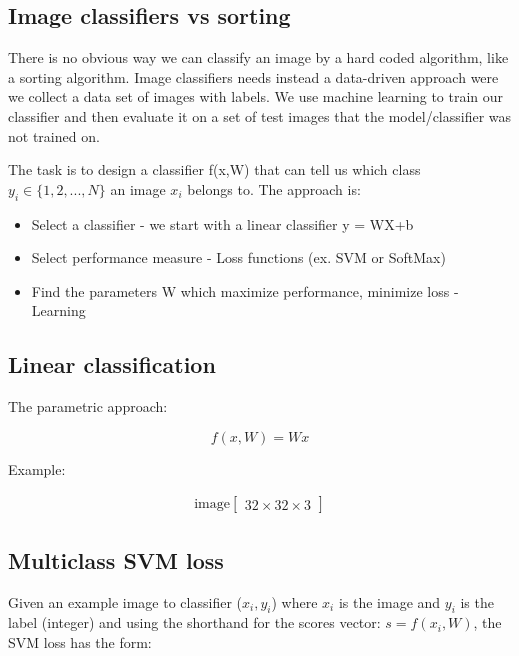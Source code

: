 \subsection*{Image classifiers vs sorting}
There is no obvious way we can classify an image by a hard coded algorithm, like a sorting algorithm. Image classifiers needs instead a data-driven approach were we collect a data set of images with labels. We use machine learning to train our classifier and then evaluate it on a set of test images that the model/classifier was not trained on. 

The task is to design a classifier f(x,W) that can tell us which class $y_i \in \{1,2,...,N\}$ an image $x_i$ belongs to. The approach is:

\begin{itemize}
 	\item Select a classifier - we start with a linear classifier y = WX+b
 	\item Select performance measure - Loss functions (ex. SVM or SoftMax)
 	\item Find the parameters W which maximize performance, minimize loss - Learning
 \end{itemize} 


\subsection*{Linear classification}
The parametric approach:

\begin{equation}
f(x,W) = Wx
\end{equation}

\begin{example}{Example: }

\begin{equation}
\begin{aligned}
\text{image} \begin{bmatrix} 32 \times 32 \times 3 \end{bmatrix} 
\end{aligned}
\end{equation}

\end{example}	


\subsection*{Multiclass SVM loss}
Given an example image to classifier ($x_i,y_i$) where $x_i$ is the image and $y_i$ is the label (integer) and using the shorthand for the scores vector: $s = f(x_i,W)$, the SVM loss has the form:

